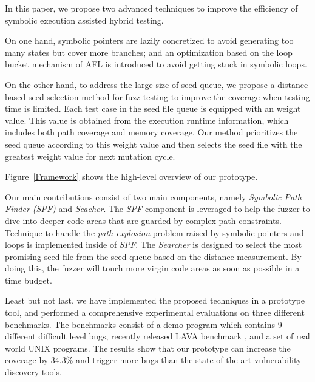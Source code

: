  In this paper, we propose two advanced techniques to improve the efficiency of symbolic execution assisted hybrid testing.

 On one hand, symbolic pointers are lazily concretized to avoid generating too many states but cover more branches; and an optimization based on the loop bucket mechanism of AFL \cite{online:afl} is introduced to avoid getting stuck in symbolic loops.
 
 On the other hand, to address the large size of seed queue, 
 we propose a distance based seed selection method for fuzz testing to improve the coverage when testing time is limited. 
 Each test case in the seed file queue is equipped with an weight value.
 This value is obtained from the execution runtime information,
 which includes both path coverage and memory coverage.
 Our method prioritizes the seed queue according to this weight value and 
 then selects the seed file with the greatest weight value for next mutation cycle.



Figure~\ref{Framework} shows the high-level overview of our prototype.

 Our main contributions consist of two main components, namely \emph{Symbolic Path Finder (SPF)} and \emph{Seacher}. 
 The \emph{SPF} component is leveraged to help the fuzzer to dive into deeper code areas 
 that are guarded by complex path constraints. 
 Technique to handle the \textit{path explosion} problem 
 raised by symbolic pointers and loops is implemented inside of \emph{SPF}. 
 The \emph{Searcher} is designed to select the most promising seed file 
 from the seed queue based on the distance measurement. 
 By doing this, the fuzzer will touch more virgin code areas as soon as possible in a time budget. 

 Least but not last,  we have implemented the proposed techniques in a prototype tool,
 and performed a comprehensive experimental evaluations on three different benchmarks. The benchmarks consist of a demo program which contains 9 different difficult level bugs, recently released LAVA benchmark \cite{dolan2016lava}, and a set of real world UNIX programs. 
 The results show that our prototype can increase the coverage by 34.3\% and trigger more bugs than the state-of-the-art vulnerability discovery tools.



